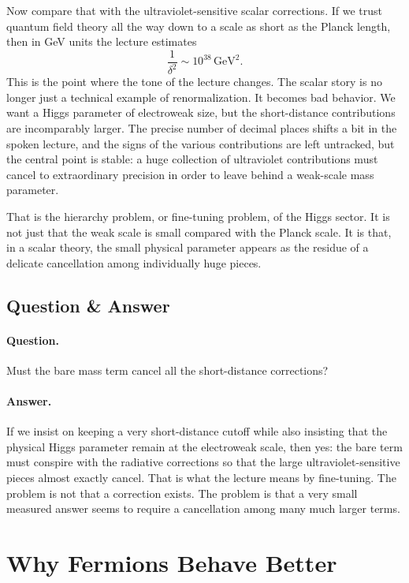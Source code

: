 Now compare that with the ultraviolet-sensitive scalar corrections. If we trust quantum field theory all the way down to a scale as short as the Planck length, then in GeV units the lecture estimates
\begin{equation}
\frac{1}{\delta^2}\sim 10^{38}\,\mathrm{GeV}^2.
\end{equation}
This is the point where the tone of the lecture changes. The scalar story is no longer just a technical example of renormalization. It becomes bad behavior. We want a Higgs parameter of electroweak size, but the short-distance contributions are incomparably larger. The precise number of decimal places shifts a bit in the spoken lecture, and the signs of the various contributions are left untracked, but the central point is stable: a huge collection of ultraviolet contributions must cancel to extraordinary precision in order to leave behind a weak-scale mass parameter.

That is the hierarchy problem, or fine-tuning problem, of the Higgs sector. It is not just that the weak scale is small compared with the Planck scale. It is that, in a scalar theory, the small physical parameter appears as the residue of a delicate cancellation among individually huge pieces.

\subsection{Question \& Answer}

\paragraph{Question.} Must the bare mass term cancel all the short-distance corrections?

\paragraph{Answer.} If we insist on keeping a very short-distance cutoff while also insisting that the physical Higgs parameter remain at the electroweak scale, then yes: the bare term must conspire with the radiative corrections so that the large ultraviolet-sensitive pieces almost exactly cancel. That is what the lecture means by fine-tuning. The problem is not that a correction exists. The problem is that a very small measured answer seems to require a cancellation among many much larger terms.

\section{Why Fermions Behave Better}

